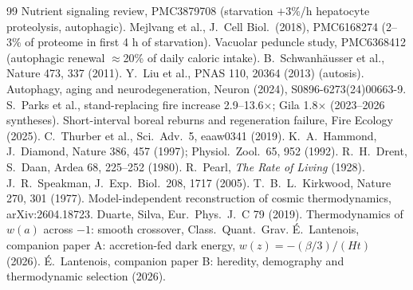 \documentclass[11pt]{article}
\begin{document}
\begin{thebibliography}{99}\small
{} Nutrient signaling review, PMC3879708 (starvation $+3\%$/h hepatocyte proteolysis, autophagic).
 Mejlvang et al., J.\ Cell Biol.\ (2018), PMC6168274 (2--3\% of proteome in first 4 h of starvation).
 Vacuolar peduncle study, PMC6368412 (autophagic renewal $\approx$20\% of daily caloric intake).
 B.\ Schwanh\"ausser et al., Nature 473, 337 (2011).
 Y.\ Liu et al., PNAS 110, 20364 (2013) (autosis).
 Autophagy, aging and neurodegeneration, Neuron (2024), S0896-6273(24)00663-9.
 S.\ Parks et al., stand-replacing fire increase 2.9--13.6$\times$; Gila 1.8$\times$ (2023--2026 syntheses).
 Short-interval boreal reburns and regeneration failure, Fire Ecology (2025).
 C.\ Thurber et al., Sci.\ Adv.\ 5, eaaw0341 (2019).
 K.\ A.\ Hammond, J.\ Diamond, Nature 386, 457 (1997); Physiol.\ Zool.\ 65, 952 (1992).
 R.\ H.\ Drent, S.\ Daan, Ardea 68, 225--252 (1980).
 R.\ Pearl, \emph{The Rate of Living} (1928).
 J.\ R.\ Speakman, J.\ Exp.\ Biol.\ 208, 1717 (2005).
 T.\ B.\ L.\ Kirkwood, Nature 270, 301 (1977).
 Model-independent reconstruction of cosmic thermodynamics, arXiv:2604.18723.
 Duarte, Silva, Eur.\ Phys.\ J.\ C 79 (2019).
 Thermodynamics of $w(a)$ across $-1$: smooth crossover, Class.\ Quant.\ Grav.
 \'E.\ Lantenois, companion paper A: accretion-fed dark energy, $w(z) = -(\beta/3)/(Ht)$ (2026).
 \'E.\ Lantenois, companion paper B: heredity, demography and thermodynamic selection (2026).
\end{thebibliography}
\end{document}
